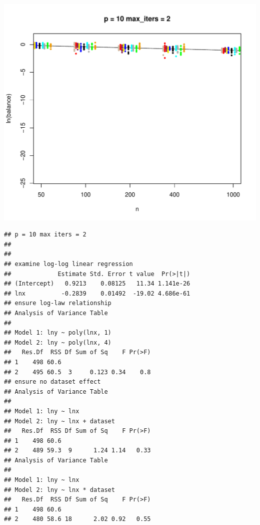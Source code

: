 \documentclass{article}\usepackage[]{graphicx}\usepackage[]{color}
\makeatletter
\def\maxwidth{ %
  \ifdim\Gin@nat@width>\linewidth
    \linewidth
  \else
    \Gin@nat@width
  \fi
}
\newenvironment{kframe}{%
 \def\at@end@of@kframe{}%
 \ifinner\ifhmode%
  \def\at@end@of@kframe{\end{minipage}}%
  \begin{minipage}{\columnwidth}%
 \fi\fi%
 \def\FrameCommand##1{\hskip\@totalleftmargin \hskip-\fboxsep
 \colorbox{shadecolor}{##1}\hskip-\fboxsep
     \hskip-\linewidth \hskip-\@totalleftmargin \hskip\columnwidth}%
 \MakeFramed {\advance\hsize-\width
   \@totalleftmargin\z@ \linewidth\hsize
   \@setminipage}}%
 {\par\unskip\endMakeFramed%
 \at@end@of@kframe}
\newenvironment{knitrout}{}{} %
\makeatother
\begin{document}
\begin{knitrout}
\includegraphics[width=\maxwidth]{figure/load_and_cleanup_data8} 
\begin{kframe}\begin{verbatim}
## p = 10 max iters = 2 
## 
## 
## examine log-log linear regression
##             Estimate Std. Error t value  Pr(>|t|)
## (Intercept)   0.9213    0.08125   11.34 1.141e-26
## lnx          -0.2839    0.01492  -19.02 4.686e-61
## ensure log-law relationship
## Analysis of Variance Table
## 
## Model 1: lny ~ poly(lnx, 1)
## Model 2: lny ~ poly(lnx, 4)
##   Res.Df  RSS Df Sum of Sq    F Pr(>F)
## 1    498 60.6                         
## 2    495 60.5  3     0.123 0.34    0.8
## ensure no dataset effect
## Analysis of Variance Table
## 
## Model 1: lny ~ lnx
## Model 2: lny ~ lnx + dataset
##   Res.Df  RSS Df Sum of Sq    F Pr(>F)
## 1    498 60.6                         
## 2    489 59.3  9      1.24 1.14   0.33
## Analysis of Variance Table
## 
## Model 1: lny ~ lnx
## Model 2: lny ~ lnx * dataset
##   Res.Df  RSS Df Sum of Sq    F Pr(>F)
## 1    498 60.6                         
## 2    480 58.6 18      2.02 0.92   0.55
\end{verbatim}
\end{kframe}

\end{knitrout}
\end{document}
